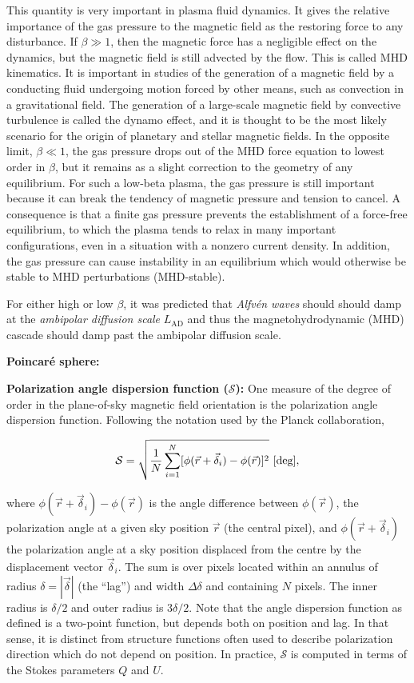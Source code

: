 \documentclass[a4paper,10pt]{article}
\begin{document}
{\noindent}This quantity is very important in plasma fluid dynamics. It gives the relative importance of the gas pressure to the magnetic field as the restoring force to any disturbance. If $\beta\gg1$, then the magnetic force has a negligible effect on the dynamics, but the magnetic field is still advected by the flow. This is called MHD kinematics. It is important in studies of the generation of a magnetic field by a conducting fluid undergoing motion forced by other means, such as convection in a gravitational field. The generation of a large-scale magnetic field by convective turbulence is called the dynamo effect, and it is thought to be the most likely scenario for the origin of planetary and stellar magnetic fields. In the opposite limit, $\beta\ll1$, the gas pressure drops out of the MHD force equation to lowest order in $\beta$, but it remains as a slight correction to the geometry of any equilibrium. For such a low-beta plasma, the gas pressure is still important because it can break the tendency of magnetic pressure and tension to cancel. A consequence is that a finite gas pressure prevents the establishment of a force-free equilibrium, to which the plasma tends to relax in many important configurations, even in a situation with a nonzero current density. In addition, the gas pressure can cause instability in an equilibrium which would otherwise be stable to MHD perturbations (MHD-stable).

{\noindent}For either high or low $\beta$, it was predicted that \textit{Alfv\'en waves} should should damp at the \textit{ambipolar diffusion scale} $L_\mathrm{AD}$ and thus the magnetohydrodynamic (MHD) cascade should damp past the ambipolar diffusion scale.

{\noindent}\textbf{Poincar\'e sphere:}

{\noindent}\textbf{Polarization angle dispersion function ($\mathcal{S}$):} One measure of the degree of order in the plane-of-sky magnetic field orientation is the polarization angle dispersion function. Following the notation used by the Planck collaboration,

\begin{align*}
	\mathcal{S} = \sqrt{ \frac{1}{N} \sum_{i=1}^N [\phi(\vec{r} + \vec{\delta}_i) - \phi(\vec{r})]^2 } ~ [\rm deg],
\end{align*}

{\noindent}where $\phi(\vec{r} + \vec{\delta}_i) - \phi(\vec{r})$ is the angle difference between $\phi(\vec{r})$, the polarization angle at a given sky position $\vec{r}$ (the central pixel), and $\phi(\vec{r} + \vec{\delta}_i)$the polarization angle at a sky position
displaced from the centre by the displacement vector $\vec{\delta}_i$. The sum is over pixels located within an annulus of radius $\delta=|\vec{\delta}|$ (the ``lag'') and width $\Delta\delta$ and containing $N$ pixels. The inner radius is $\delta/2$ and outer radius is $3\delta/2$.  Note that the angle dispersion function as defined is a two-point function, but depends both on position and lag. In that sense, it is distinct from structure functions often used to describe polarization direction which do not depend on position. In practice, $\mathcal{S}$ is computed in terms of the Stokes parameters $Q$ and $U$.
\end{document}

